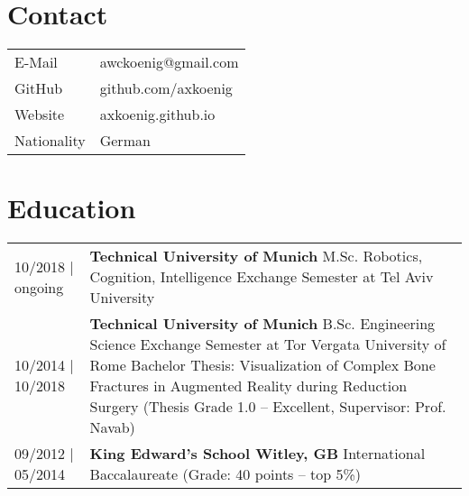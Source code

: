 \documentclass{article}
\begin{document}
\section*{Contact}
\begin{tabular}{@{}ll}
E-Mail & awckoenig@gmail.com \\
GitHub & github.com/axkoenig \\
Website & axkoenig.github.io \\
Nationality & German \\ 
\end{tabular}

\setlength{\extrarowheight}{6pt}

\section*{Education}
\begin{tabularx}{\textwidth}{@{}lX}

10/2018 | ongoing &  \textbf{Technical University of Munich} \newline
                  	 M.Sc. Robotics, Cognition, Intelligence \newline 
                  	 Exchange Semester at Tel Aviv University \\
10/2014 | 10/2018 &  \textbf{Technical University of Munich} \newline
                  	 B.Sc. Engineering Science \newline 
                  	 Exchange Semester at Tor Vergata University of Rome \newline 
                  	 Bachelor Thesis: Visualization of Complex Bone Fractures in Augmented Reality during Reduction Surgery (Thesis Grade 1.0 -- Excellent, Supervisor: Prof. Navab) \\
09/2012 | 05/2014 &  \textbf{King Edward's School Witley, GB} \newline
                  	 International Baccalaureate (Grade: 40 points -- top 5\%) \\
\end{tabularx}

\end{document}
